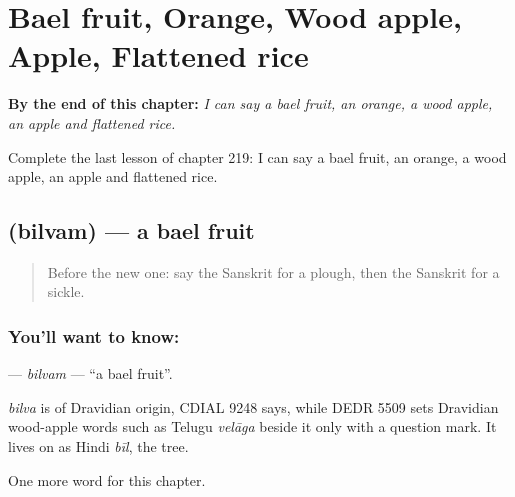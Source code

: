 
\chapter{Bael fruit, Orange, Wood apple, Apple, Flattened rice}
\label{ch:sa-bael-fruit-orange-wood-apple-apple-flattened-rice}

\begin{chapteropening}
\textbf{By the end of this chapter:} \emph{I can say a bael fruit, an orange, a wood apple, an apple and flattened rice.}

Complete the last lesson of chapter 219: I can say a bael fruit, an orange, a wood apple, an apple and flattened rice.
\end{chapteropening}

\section[\texorpdfstring{\sk{बिल्वम्} (bilvam)}{बिल्वम् (bilvam)}]{ (bilvam) — a bael fruit}

\label{lesson:SA-C219-bilvam}



\begin{quote}
Before the new one: say the Sanskrit for a plough, then the Sanskrit for a sickle.
\end{quote}

\subsection*{You'll want to know: }
\textbf{} — \emph{bilvam} — \textquotedblleft{}a bael fruit\textquotedblright{}.

\begin{cousinweb}
\emph{bilva} is of Dravidian origin, CDIAL 9248 says, while DEDR 5509 sets Dravidian wood-apple words such as Telugu \emph{velāga} beside it only with a question mark. It lives on as Hindi \emph{bīl}, the tree.
\end{cousinweb}

\begin{grammarlens}[title={What you've built}]
One more word for this chapter.
\end{grammarlens}

